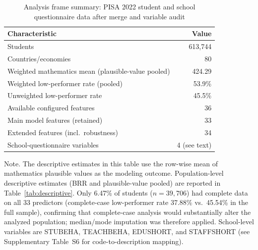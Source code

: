 \begin{table}[htp]
\centering
\small
\caption{Analysis frame summary: PISA 2022 student and school questionnaire data after merge and variable audit\label{tab:sample}}
\begin{tabular}{@{}lr@{}}
\toprule
\textbf{Characteristic} & \textbf{Value} \\
\midrule
  Students & 613,744 \\
  Countries/economies & 80 \\
  Weighted mathematics mean (plausible-value pooled) & 424.29 \\
  Weighted low-performer rate (pooled) & 53.9\% \\
  Unweighted low-performer rate & 45.5\% \\
  Available configured features & 36 \\
  Main model features (retained) & 33 \\
  Extended features (incl.\ robustness) & 34 \\
  School-questionnaire variables & 4 (see text) \\
\bottomrule
\end{tabular}
\begin{tablenotes}
\item Note. The descriptive estimates in this table use the row-wise mean of mathematics plausible values as the modeling outcome. Population-level descriptive estimates (BRR and plausible-value pooled) are reported in Table~\ref{tab:descriptive}. Only 6.47\% of students ($n = 39{,}706$) had complete data on all 33 predictors (complete-case low-performer rate 37.88\% vs.\ 45.54\% in the full sample), confirming that complete-case analysis would substantially alter the analyzed population; median/mode imputation was therefore applied. School-level variables are STUBEHA, TEACHBEHA, EDUSHORT, and STAFFSHORT (see Supplementary Table~S6 for code-to-description mapping).
\end{tablenotes}
\end{table}
